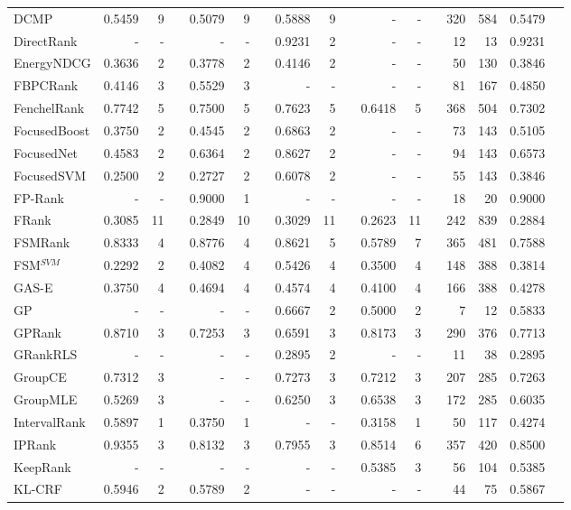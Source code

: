 \documentclass{sig-alternate}
\begin{document}
\begin{longtable}[!hp]{@{}lrrrrrrrrrrrrrrrr@{}}
DCMP & 0.5459 & 9 && 0.5079 & 9 && 0.5888 & 9 && - & - && 320 & 584 & 0.5479 \\
DirectRank & - & - && - & - && 0.9231 & 2 && - & - && 12 & 13 & 0.9231 \\
EnergyNDCG & 0.3636 & 2 && 0.3778 & 2 && 0.4146 & 2 && - & - && 50 & 130 & 0.3846 \\
FBPCRank & 0.4146 & 3 && 0.5529 & 3 && - & - && - & - && 81 & 167 & 0.4850 \\
FenchelRank & 0.7742 & 5 && 0.7500 & 5 && 0.7623 & 5 && 0.6418 & 5 && 368 & 504 & 0.7302 \\
FocusedBoost & 0.3750 & 2 && 0.4545 & 2 && 0.6863 & 2 && - & - && 73 & 143 & 0.5105 \\
FocusedNet & 0.4583 & 2 && 0.6364 & 2 && 0.8627 & 2 && - & - && 94 & 143 & 0.6573 \\
FocusedSVM & 0.2500 & 2 && 0.2727 & 2 && 0.6078 & 2 && - & - && 55 & 143 & 0.3846 \\
FP-Rank & - & - && 0.9000 & 1 && - & - && - & - && 18 & 20 & 0.9000 \\
FRank & 0.3085 & 11 && 0.2849 & 10 && 0.3029 & 11 && 0.2623 & 11 && 242 & 839 & 0.2884 \\
FSMRank & 0.8333 & 4 && 0.8776 & 4 && 0.8621 & 5 && 0.5789 & 7 && 365 & 481 & 0.7588 \\
FSM$^{SVM}$ & 0.2292 & 2 && 0.4082 & 4 && 0.5426 & 4 && 0.3500 & 4 && 148 & 388 & 0.3814 \\
GAS-E & 0.3750 & 4 && 0.4694 & 4 && 0.4574 & 4 && 0.4100 & 4 && 166 & 388 & 0.4278 \\
GP & - & - && - & - && 0.6667 & 2 && 0.5000 & 2 && 7 & 12 & 0.5833 \\
GPRank & 0.8710 & 3 && 0.7253 & 3 && 0.6591 & 3 && 0.8173 & 3 && 290 & 376 & 0.7713 \\
GRankRLS & - & - && - & - && 0.2895 & 2 && - & - && 11 & 38 & 0.2895 \\
GroupCE & 0.7312 & 3 && - & - && 0.7273 & 3 && 0.7212 & 3 && 207 & 285 & 0.7263 \\
GroupMLE & 0.5269 & 3 && - & - && 0.6250 & 3 && 0.6538 & 3 && 172 & 285 & 0.6035 \\
IntervalRank & 0.5897 & 1 && 0.3750 & 1 && - & - && 0.3158 & 1 && 50 & 117 & 0.4274 \\
IPRank & 0.9355 & 3 && 0.8132 & 3 && 0.7955 & 3 && 0.8514 & 6 && 357 & 420 & 0.8500 \\
KeepRank & - & - && - & - && - & - && 0.5385 & 3 && 56 & 104 & 0.5385 \\
KL-CRF & 0.5946 & 2 && 0.5789 & 2 && - & - && - & - && 44 & 75 & 0.5867 \\

\end{longtable}
\end{document}
